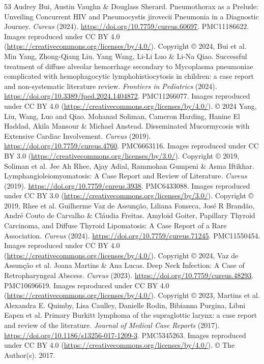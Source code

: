 \begin{thebibliography}{53}
 Audrey Bui, Austin Vaughn \& Douglass Sherard. Pneumothorax as a Prelude: Unveiling Concurrent HIV and Pneumocystis jirovecii Pneumonia in a Diagnostic Journey. \textit{Cureus} (2024). \url{https://doi.org/10.7759/cureus.60697}. PMC11186622. Images reproduced under CC BY 4.0 (\url{https://creativecommons.org/licenses/by/4.0/}). Copyright © 2024, Bui et al.
 Min Yang, Zhong-Qiang Liu, Yang Wang, Li-Li Luo \& Li-Na Qiao. Successful treatment of diffuse alveolar hemorrhage secondary to Mycoplasma pneumoniae complicated with hemophagocytic lymphohistiocytosis in children: a case report and non-systematic literature review. \textit{Frontiers in Pediatrics} (2024). \url{https://doi.org/10.3389/fped.2024.1404872}. PMC11266077. Images reproduced under CC BY 4.0 (\url{https://creativecommons.org/licenses/by/4.0/}). © 2024 Yang, Liu, Wang, Luo and Qiao.
 Mohanad Soliman, Cameron Harding, Hanine El Haddad, Akila Mansour \& Michael Anstead. Disseminated Mucormycosis with Extensive Cardiac Involvement. \textit{Cureus} (2019). \url{https://doi.org/10.7759/cureus.4760}. PMC6663116. Images reproduced under CC BY 3.0 (\url{https://creativecommons.org/licenses/by/3.0/}). Copyright © 2019, Soliman et al.
 Jee Ah Rhee, Ajay Adial, Rammohan Gumpeni \& Asma Iftikhar. Lymphangioleiomyomatosis: A Case Report and Review of Literature. \textit{Cureus} (2019). \url{https://doi.org/10.7759/cureus.3938}. PMC6433088. Images reproduced under CC BY 3.0 (\url{https://creativecommons.org/licenses/by/3.0/}). Copyright © 2019, Rhee et al.
 Guilherme Vaz de Assunção, Liliana Fonseca, José R Brandão, André Couto de Carvalho \& Cláudia Freitas. Amyloid Goiter, Papillary Thyroid Carcinoma, and Diffuse Thyroid Lipomatosis: A Case Report of a Rare Association. \textit{Cureus} (2024). \url{https://doi.org/10.7759/cureus.71245}. PMC11550454. Images reproduced under CC BY 4.0 (\url{https://creativecommons.org/licenses/by/4.0/}). Copyright © 2024, Vaz de Assunção et al.
 Joana Martins \& Ana Lucas. Deep Neck Infection: A Case of Retropharyngeal Abscess. \textit{Cureus} (2023). \url{https://doi.org/10.7759/cureus.48293}. PMC10696619. Images reproduced under CC BY 4.0 (\url{https://creativecommons.org/licenses/by/4.0/}). Copyright © 2023, Martins et al.
 Alexandra E. Quimby, Lisa Caulley, Danielle Rodin, Bibianna Purgina, Libni Eapen et al. Primary Burkitt lymphoma of the supraglottic larynx: a case report and review of the literature. \textit{Journal of Medical Case Reports} (2017). \url{https://doi.org/10.1186/s13256-017-1209-3}. PMC5345263. Images reproduced under CC BY 4.0 (\url{https://creativecommons.org/licenses/by/4.0/}). © The Author(s). 2017.

\end{thebibliography}
